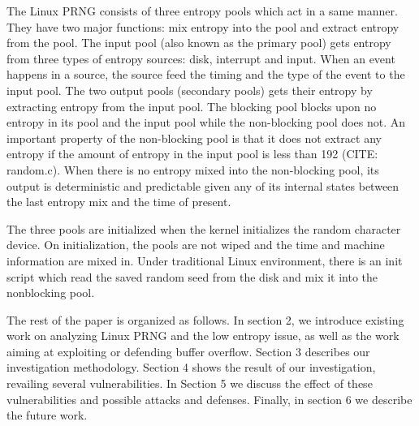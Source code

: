 The Linux PRNG consists of three entropy pools which act in a same manner. They have two major functions: mix entropy into the pool and extract entropy from the pool. The input pool (also known as the primary pool) gets entropy from three types of entropy sources: disk, interrupt and input. When an event happens in a source, the source feed the timing and the type of the event to the input pool. The two output pools (secondary pools) gets their entropy by extracting entropy from the input pool. The blocking pool blocks upon no entropy in its pool and the input pool while the non-blocking pool does not. An important property of the non-blocking pool is that it does not extract any entropy if the amount of entropy in the input pool is less than 192 (CITE: random.c). When there is no entropy mixed into the non-blocking pool, its output is deterministic and predictable given any of its internal states between the last entropy mix and the time of present. 

The three pools are initialized when the kernel initializes the random character device. On initialization, the pools are not wiped and the time and machine information are mixed in. Under traditional Linux environment, there is an init script which read the saved random seed from the disk and mix it into the nonblocking pool.



The rest of the paper is organized as follows. In section 2, we introduce existing work on analyzing Linux PRNG and the low entropy issue, as well as the work aiming at exploiting or defending buffer overflow. Section 3 describes our investigation methodology. Section 4 shows the result of our investigation, revailing several vulnerabilities. In Section 5 we discuss the effect of these vulnerabilities and possible attacks and defenses. Finally, in section 6 we describe the future work.
